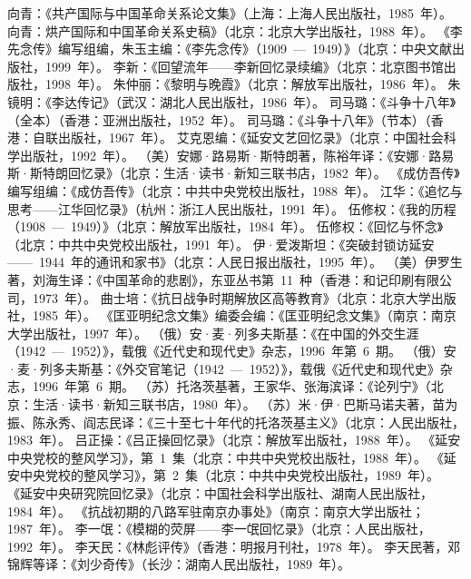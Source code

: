 \begin{thebibliography}{999}
\bibitem{}向青：《共产国际与中国革命关系论文集》（上海：上海人民出版社，1985~年）。
\bibitem{}向青：烘产国际和中国革命关系史稿》（北京：北京大学出版社，1988~年）。
\bibitem{}《李先念传》编写组编，朱玉主编：《李先念传》（1909~—~1949）》（北京：中央文献出版社，1999~年）。
\bibitem{}李新：《回望流年——李新回忆录续编》（北京：北京图书馆出版社，1998~年）。
\bibitem{}朱仲丽：《黎明与晚霞》（北京：解放军出版社，1986~年）。
\bibitem{}朱镜明：《李达传记》（武汉：湖北人民出版社，1986~年）。
\bibitem{}司马璐：《斗争十八年》（全本）（香港：亚洲出版社，1952~年）。
\bibitem{}司马璐：《斗争十八年》（节本）（香港：自联出版社，1967~年）。
\bibitem{}艾克恩编：《延安文艺回忆录》（北京：中国社会科学出版社，1992~年）。
\bibitem{}（美）安娜·路易斯·斯特朗著，陈裕年译：《安娜·路易斯·斯特朗回忆录》（北京：生活·读书·新知三联书店，1982~年）。
\bibitem{}《成仿吾传》编写组编：《成仿吾传》（北京：中共中央党校出版社，1988~年）。
\bibitem{}江华：《追忆与思考——江华回忆录》（杭州：浙江人民出版社，1991~年）。
\bibitem{}伍修权：《我的历程（1908~—~1949）》（北京：解放军出版社，1984~年）。
\bibitem{}伍修权：《回忆与怀念》（北京：中共中央党校出版社，1991~年）。
\bibitem{}伊·爱泼斯坦：《突破封锁访延安——~1944~年的通讯和家书》（北京：人民日报出版社，1995~年）。
\bibitem{}（美）伊罗生著，刘海生译：《中国革命的悲剧》，东亚丛书第~11~种（香港：和记印刷有限公司，1973~年）。
\bibitem{}曲士培：《抗日战争时期解放区高等教育》（北京：北京大学出版社，1985~年）。
\bibitem{}《匡亚明纪念文集》编委会编：《匡亚明纪念文集》（南京：南京大学出版社，1997~年）。
\bibitem{}（俄）安·麦·列多夫斯基：《在中国的外交生涯（1942~—~1952）》，载俄《近代史和现代史》杂志，1996~年第~6~期。
\bibitem{}（俄）安·麦·列多夫斯基：《外交官笔记（1942~—~1952）》，载俄《近代史和现代史》杂志，1996~年第~6~期。
\bibitem{}（苏）托洛茨基著，王家华、张海滨译：《论列宁》（北京：生活·读书·新知三联书店，1980~年）。
\bibitem{}（苏）米·伊·巴斯马诺夫著，苗为振、陈永秀、阎志民译：《三十至七十年代的托洛茨基主义》（北京：人民出版社，1983~年）。
\bibitem{}吕正操：《吕正操回忆录》（北京：解放军出版社，1988~年）。
\bibitem{}《延安中央党校的整风学习》，第~1~集（北京：中共中央党校出版社，1988~年）。
\bibitem{}《延安中央党校的整风学习》，第~2~集（北京：中共中央党校出版社，1989~年）。
\bibitem{}《延安中央研究院回忆录》（北京：中国社会科学出版社、湖南人民出版社，1984~年）。
\bibitem{}《抗战初期的八路军驻南京办事处》（南京：南京大学出版社；1987~年）。
\bibitem{}李一氓：《模糊的荧屏——李一氓回忆录》（北京：人民出版社，1992~年）。
\bibitem{}李天民：《林彪评传》（香港：明报月刊社，1978~年）。
\bibitem{}李天民著，邓锦辉等译：《刘少奇传》（长沙：湖南人民出版社，1989~年）。

\end{thebibliography}
